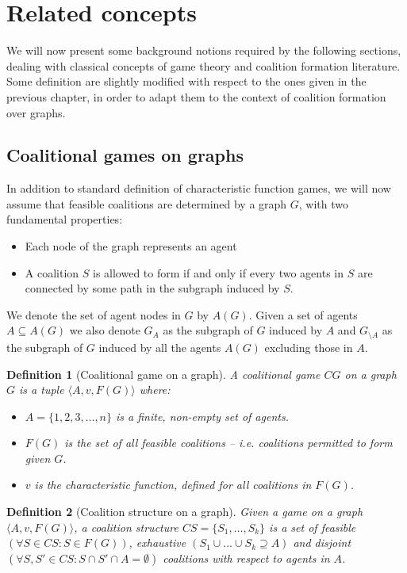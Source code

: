 \documentclass[11pt, twoside, titlepage, a4paper, openright]{report}
\newtheorem{Def}{Definition}
\begin{document}
\section{Related concepts}

We will now present some background notions required by the following sections, dealing with classical concepts of game theory and coalition formation literature. Some definition are slightly modified with respect to the ones given in the previous chapter, in order to adapt them to the context of coalition formation over graphs.

\subsection{Coalitional games on graphs}\label{subsec:coalgamesgraph}

In addition to standard definition of characteristic function games, we will now assume that feasible coalitions are determined by a graph $G$, with two fundamental properties:

\begin{itemize}
\item Each node of the graph represents an agent
\item A coalition $S$ is allowed to form if and only if every two agents in $S$ are connected by some path in the subgraph induced by $S$. 
\end{itemize}

\noindent We denote the set of agent nodes in $G$ by $A(G)$. Given a set of agents $A \subseteq A(G)$ we also denote $G_A$ as the subgraph of $G$ induced by $A$ and $G_{\setminus A}$ as the subgraph of $G$ induced by all the agents $A(G)$ excluding those in $A$.

\begin{Def}[Coalitional game on a graph]
A \textit{coalitional game $CG$ on a graph $G$} is a tuple $\langle A, v, F(G)\rangle$ where: 
\begin{itemize}
\item $A=\{1,2,3,\ldots,n\}$ is a finite, non-empty set of agents.
\item $F(G)$ is the set of all feasible coalitions -- \textit{i.e.} coalitions permitted to form given $G$.
\item $v$ is the characteristic function, defined for all coalitions in $F(G)$.
\end{itemize}
\end{Def}

\begin{Def}[Coalition structure on a graph]
Given a game on a graph $\langle A, v, F(G)\rangle$, a coalition structure $CS = \{S_1,\ldots,S_k\}$ is a set of \textit{feasible} $(\forall S \in CS : S \in F(G))$, \textit{exhaustive} $(S_1 \cup \ldots \cup S_k \supseteq A)$ and \textit{disjoint} $(\forall S, S' \in CS:
S \cap S' \cap A = \emptyset)$ coalitions with respect to agents in $A$.
\end{Def}
\end{document}
